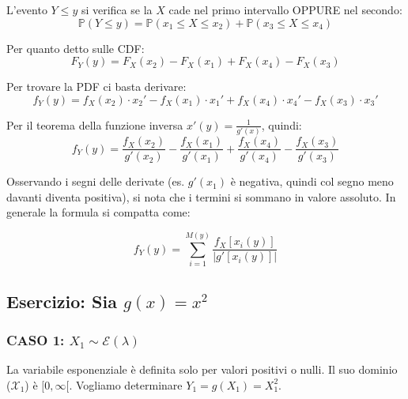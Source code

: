 L'evento $Y \le y$ si verifica se la $X$ cade nel primo intervallo OPPURE nel secondo:
\begin{equation}
\mathbb{P}(Y \le y) = \mathbb{P}(x_1 \le X \le x_2) + \mathbb{P}(x_3 \le X \le x_4)
\end{equation}

Per quanto detto sulle CDF:
\begin{equation}
F_Y(y) = F_X(x_2) - F_X(x_1) + F_X(x_4) - F_X(x_3)
\end{equation}

Per trovare la PDF ci basta derivare:
\begin{equation}
f_Y(y) = f_X(x_2) \cdot x_2' - f_X(x_1) \cdot x_1' + f_X(x_4) \cdot x_4' - f_X(x_3) \cdot x_3'
\end{equation}

Per il teorema della funzione inversa $x'(y) = \frac{1}{g'(x)}$, quindi:
\begin{equation}
f_Y(y) = \frac{f_X(x_2)}{g'(x_2)} - \frac{f_X(x_1)}{g'(x_1)} + \frac{f_X(x_4)}{g'(x_4)} - \frac{f_X(x_3)}{g'(x_3)}
\end{equation}

Osservando i segni delle derivate (es. $g'(x_1)$ è negativa, quindi col segno meno davanti diventa positiva), si nota che i termini si sommano in valore assoluto. In generale la formula si compatta come:

\begin{equation}
\boxed{ f_Y(y) = \sum_{i=1}^{M(y)} \frac{f_X[x_i(y)]}{|g'[x_i(y)]|} }
\end{equation}


\subsection{Esercizio: Sia $g(x) = x^2$}

\subsubsection*{CASO 1: $X_1 \sim \mathcal{E}(\lambda)$}

La variabile esponenziale è definita solo per valori positivi o nulli. Il suo dominio ($\mathcal{X}_1$) è $[0, \infty[$. 
Vogliamo determinare $Y_1 = g(X_1) = X_1^2$.

\begin{center}
\end{center}

